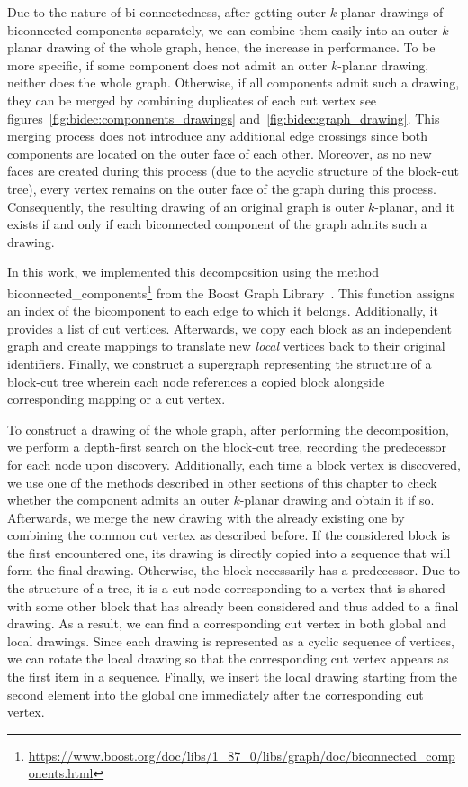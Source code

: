 
Due to the nature of bi-connectedness, after getting outer \(k\)-planar drawings of biconnected components separately, we can combine them easily into an outer \(k\)-planar drawing of the whole graph, hence, the increase in performance. To be more specific, if some component does not admit an outer \(k\)-planar drawing, neither does the whole graph. Otherwise, if all components admit such a drawing, they can be merged by combining duplicates of each cut vertex see figures~\ref{fig:bidec:componnents_drawings} and~\ref{fig:bidec:graph_drawing}. This merging process does not introduce any additional edge crossings since both components are located on the outer face of each other. Moreover, as no new faces are created during this process (due to the acyclic structure of the block-cut tree), every vertex remains on the outer face of the graph during this process. Consequently, the resulting drawing of an original graph is outer \(k\)-planar, and it exists if and only if each biconnected component of the graph admits such a drawing.

In this work, we implemented this decomposition using the method \textsf{bi\-connec\-ted\_compo\-nents}\footnote{\url{https://www.boost.org/doc/libs/1_87_0/libs/graph/doc/biconnected_components.html}} from the Boost Graph Library~\cite{boost}. This function assigns an index of the bicomponent to each edge to which it belongs. Additionally, it provides a list of cut vertices. Afterwards, we copy each block as an independent graph and create mappings to translate new \emph{local} vertices back to their original identifiers. Finally, we construct a supergraph representing the structure of a block-cut tree wherein each node references a copied block alongside corresponding mapping or a cut vertex.

To construct a drawing of the whole graph, after performing the decomposition, we perform a depth-first search on the block-cut tree, recording the predecessor for each node upon discovery. Additionally, each time a block vertex is discovered, we use one of the methods described in other sections of this chapter to check whether the component admits an outer \(k\)-planar drawing and obtain it if so. Afterwards, we merge the new drawing with the already existing one by combining the common cut vertex as described before. If the considered block is the first encountered one, its drawing is directly copied into a sequence that will form the final drawing. Otherwise, the block necessarily has a predecessor. Due to the structure of a tree, it is a cut node corresponding to a vertex that is shared with some other block that has already been considered and thus added to a final drawing. As a result, we can find a corresponding cut vertex in both global and local drawings. Since each drawing is represented as a cyclic sequence of vertices, we can rotate the local drawing so that the corresponding cut vertex appears as the first item in a sequence. Finally, we insert the local drawing starting from the second element into the global one immediately after the corresponding cut vertex.


